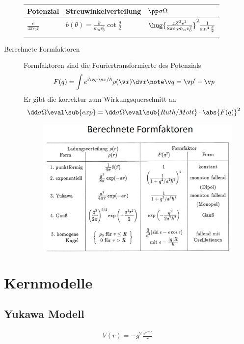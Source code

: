 \documentclass[twocolumn]{summery_4.1}
\begin{document}
\begin{description}
    \begin{center}
    \begin{tabular*}{.49\textwidth}{@{}lll@{}}
        \toprule
        {\bf Potenzial} & {\bf Streuwinkelverteilung} & {\bf \(\pp \sigma\Omega\)} \\
        \midrule
        \(\frac{e}{4\pi \varepsilon_0 r}\)& \(b(\theta) = \frac{k}{m_\alpha v_0^2}\cot\frac\theta2\) & \(\hug{\frac{z Z^2 e^2}{8\pi \varepsilon_0 m_\alpha v_0^2}}^2 \frac{1}{\sin^4 \frac\theta 2}\)\\
        & \\
        \bottomrule
    \end{tabular*}
    \end{center}
    \item[Berechnete Formfaktoren]
    Formfaktoren sind die Fouriertransformierte des Potenzials
    \begin{align*}
        F(q) &= \int e^{i \v q\cdot \v x / \hbar } \rho(\v x) \dv x\note \v q = \v p' - \v p
    \end{align*}
    Er gibt die korrektur zum Wirkungsquerschnitt an
    \begin{align*}
        \dd\sigma\Omega\eval\sub{exp} &= \dd\sigma\Omega\eval\sub{Ruth/Mott} \cdot \abs{F(q)}^2
    \end{align*}
    \begin{figure}[H]
        \centering
        \includegraphics[width=.49\textwidth]{Tabelle_Streuung.png}
    \end{figure}
\end{description}

\section{Kernmodelle}
\subsection{Yukawa Modell}
\begin{align*}
    V(r) = -g^2 \frac{e^{-mr}}{r}
\end{align*}
\end{document}
